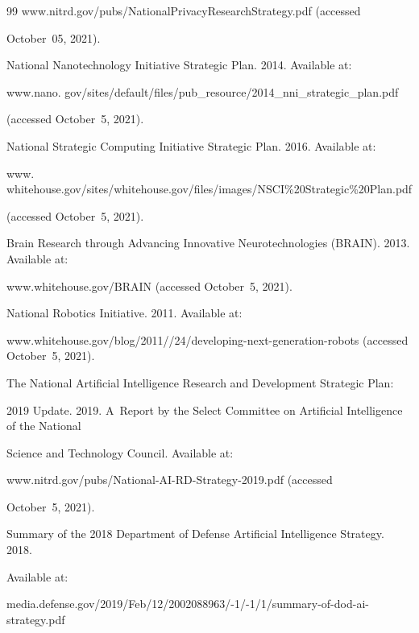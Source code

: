 {{\begin{thebibliography}{99}
     {\sf www.nitrd.gov/pubs/\linebreak NationalPrivacyResearchStrategy.pdf} (accessed


October~05, 2021).




National Nanotechnology Initiative Strategic Plan. 2014. Available at:


     {\sf


www.nano. gov/sites/default/files/pub\_resource/2014\_nni\_strategic\_plan.pdf} (accessed October~5, 2021).




National Strategic Computing Initiative Strategic Plan. 2016. Available at:


     {\sf


www. whitehouse.gov/sites/whitehouse.gov/files/images/NSCI\%20Strategic\%20Plan.pdf} (accessed October~5, 2021).




Brain Research through Advancing Innovative Neurotechnologies (BRAIN). 2013. Available at:


     {\sf www.whitehouse.gov/BRAIN} (accessed October~5, 2021).




National Robotics Initiative. 2011. Available at:


     {\sf www.whitehouse.gov/blog/2011//24/developing-next-generation-robots} (accessed October~5, 2021).




The National Artificial Intelligence Research and Development Strategic Plan:


2019 Update. 2019. A~Report by the Select Committee on Artificial Intelligence of the National


Science and Technology Council. Available at:


     {\sf www.nitrd.gov/pubs/National-AI-RD-Strategy-2019.pdf} (accessed


October~5, 2021).




Summary of the 2018 Department of Defense Artificial Intelligence Strategy. 2018.


Available at:


     {\sf media.defense.gov/2019/Feb/12/2002088963/-1/-1/1/summary-of-dod-ai-strategy.pdf}



\end{thebibliography}}}
